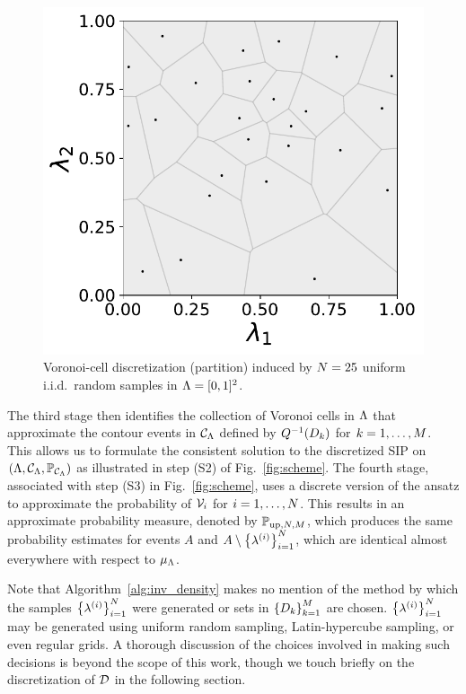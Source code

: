 \begin{figure}[ht]
\centering
	\begin{minipage}{.475\textwidth}
		\includegraphics[width=\linewidth]{./images/voronoi_diagrams/voronoi_diagram_N25_r0}
	\end{minipage}
\caption{
Voronoi-cell discretization (partition) induced by $N = 25 $ uniform i.i.d.~random samples in ${\Lambda} = [0,1]^2$.
}
\label{fig:voronoi_cells}
\end{figure}

The third stage then identifies the collection of Voronoi cells in ${\Lambda}$ that approximate the contour events in $\mathcal{C}_{{\Lambda}}$ defined by $Q^{-1}(D_k)$ for $k=1,\hdots,M$. This allows us to formulate the consistent solution to the discretized SIP on $({\Lambda}, \mathcal{C}_{{\Lambda}}, \operatorname*{\mathbb{P}_{\mathcal{C}_{{\Lambda}}}})$ as illustrated in step (S2) of Fig.~\ref{fig:scheme}.
The fourth stage, associated with step (S3) in Fig.~\ref{fig:scheme}, uses a discrete version of the ansatz to approximate the probability of $\mathcal{V}_i$ for $i=1,\dots,N$.
This results in an approximate probability measure, denoted by $\mathbb{P}_{\text{up},N,M}$, which produces the same probability estimates for events $A$ and $A\setminus \left\{ \lambda^{(i)} \right\}_{i=1}^N$, which are identical almost everywhere with respect to $\mu_{{\Lambda}}$.

Note that Algorithm~\ref{alg:inv_density} makes no mention of the method by which the samples $\left\{ \lambda^{(i)} \right\}_{i=1}^{N}$ were generated or sets in $\left\{D_k\right\}_{k=1}^{M}$ are chosen.
$\left\{ \lambda^{(i)} \right\}_{i=1}^{N}$ may be generated using uniform random sampling, Latin-hypercube sampling, or even regular grids.
A thorough discussion of the choices involved in making such decisions is beyond the scope of this work, though we touch briefly on the discretization of $\mathcal{D}$ in the following section.
